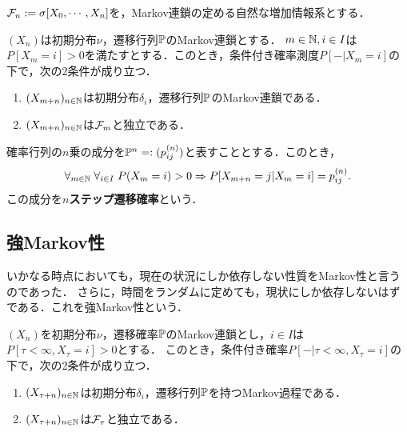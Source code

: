 \documentclass[uplatex,dvipdfmx]{jsreport}
\begin{document}
\begin{notation}
    $\mathcal{F}_n:=\sigma[X_0,\cdots,X_n]$を，Markov連鎖の定める自然な増加情報系とする．
\end{notation}

\begin{theorem}
    $(X_n)$は初期分布$\nu$，遷移行列$\mathbb{P}$のMarkov連鎖とする．
    $m\in\mathbb{N},i\in I$は$P[X_m=i]>0$を満たすとする．このとき，条件付き確率測度$P[-|X_m=i]$の下で，次の2条件が成り立つ．
    \begin{enumerate}
        \item $(X_{m+n})_{n\in\mathbb{N}}$は初期分布$\delta_i$，遷移行列$\mathbb{P}$のMarkov連鎖である．
        \item $(X_{m+n})_{n\in\mathbb{N}}$は$\mathcal{F}_m$と独立である．
    \end{enumerate}
\end{theorem}

\begin{lemma}
    確率行列の$n$乗の成分を$\mathbb{P}^n=:(p_{ij}^{(n)})$と表すこととする．このとき，
    \[\forall_{m\in\mathbb{N}}\;\forall_{i\in I}\;P(X_m=i)>0\Rightarrow P[X_{m+n}=j|X_m=i]=p^{(n)}_{ij}.\]
    この成分を\textbf{$n$ステップ遷移確率}という．
\end{lemma}

\subsection{強Markov性}

\begin{tcolorbox}[colframe=ForestGreen, colback=ForestGreen!10!white,breakable,colbacktitle=ForestGreen!40!white,coltitle=black,fonttitle=\bfseries\sffamily,
title=]
    いかなる時点においても，現在の状況にしか依存しない性質をMarkov性と言うのであった．
    さらに，時間をランダムに定めても，現状にしか依存しないはずである．これを強Markov性という．
\end{tcolorbox}

\begin{theorem}
    $(X_n)$を初期分布$\nu$，遷移確率$\mathbb{P}$のMarkov連鎖とし，$i\in I$は$P[\tau<\infty,X_\tau=i]>0$とする．
    このとき，条件付き確率$P[-|\tau<\infty,X_\tau=i]$の下で，次の2条件が成り立つ．
    \begin{enumerate}
        \item $(X_{\tau+n})_{n\in\mathbb{N}}$は初期分布$\delta_i$，遷移行列$\mathbb{P}$を持つMarkov過程である．
        \item $(X_{\tau+n})_{n\in\mathbb{N}}$は$\mathcal{F}_\tau$と独立である．
    \end{enumerate}
\end{theorem}
\end{document}
